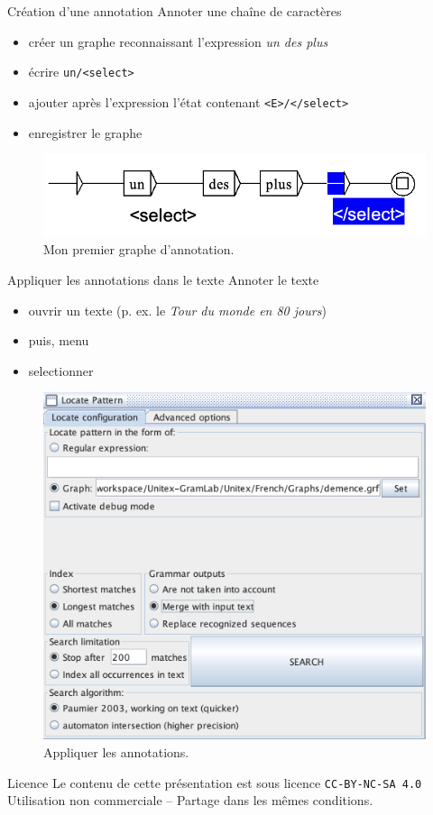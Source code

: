 \documentclass[xetex,xcolor={table,usenames,dvipsnames}]{beamer}
\begin{document}
\begin{frame}{Création d'une annotation}
	\textcolor{deepblue}{Annoter une chaîne de caractères}
	\begin{itemize}
		\item créer un graphe reconnaissant l'expression \textit{un des plus}
		\item écrire \texttt{un/<select>}
		\item ajouter après l'expression l'état contenant \texttt{<E>/</select>}
		\item enregistrer le graphe
	\end{itemize}
					\begin{figure}[h] %
		\centering
		\includegraphics[width=.5\linewidth]{img/un_des_plus.png}
		\caption{Mon premier graphe d'annotation.}
		\label{fig:ling_out_TAL}
	\end{figure}
\end{frame}

\begin{frame}{Appliquer les annotations dans le texte}
\textcolor{deepblue}{Annoter le texte}
		\begin{itemize}
		\item ouvrir un texte (p. ex. le \textit{Tour du monde en 80 jours})
		\item puis, menu 
		\item selectionner 
	\end{itemize}
			\begin{figure}[h] %
		\centering
		\includegraphics[width=.4\linewidth]{img/merge.png}
		\caption{Appliquer les annotations.}
		\label{fig:ling_out_TAL}
	\end{figure}
\end{frame}

\begin{frame}[allowframebreaks]
		\printbibliography
\end{frame}




\begin{frame}{Licence}
	\centering
	{\small Le contenu de cette présentation est sous licence \texttt{CC-BY-NC-SA 4.0}\\Utilisation non commerciale -- Partage dans les mêmes conditions.\\}
	\href{https://creativecommons.org/licenses/by-nc-sa/4.0/deed.fr}{\ccbyncsa}
\end{frame}
\end{document}
